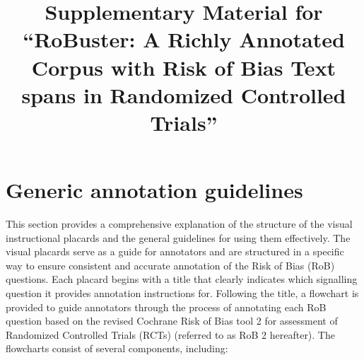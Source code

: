 \documentclass[sn-mathphys,Numbered]{sn-jnl}%
\begin{document}
\title[Article Title]{Supplementary Material for ``RoBuster: A Richly Annotated Corpus with Risk of Bias Text spans in Randomized Controlled Trials''}



\maketitle


\section*{Generic annotation guidelines}
\label{sec:generic}
%
This section provides a comprehensive explanation of the structure of the visual instructional placards and the general guidelines for using them effectively.
The visual placards serve as a guide for annotators and are structured in a specific way to ensure consistent and accurate annotation of the Risk of Bias (RoB) questions.
Each placard begins with a title that clearly indicates which signalling question it provides annotation instructions for. 
Following the title, a flowchart is provided to guide annotators through the process of annotating each RoB question based on the revised Cochrane Risk of Bias tool 2 for assessment of Randomized Controlled Trials (RCTs) (referred to as RoB 2 hereafter).
The flowcharts consist of several components, including:
%
%
%
\end{document}
